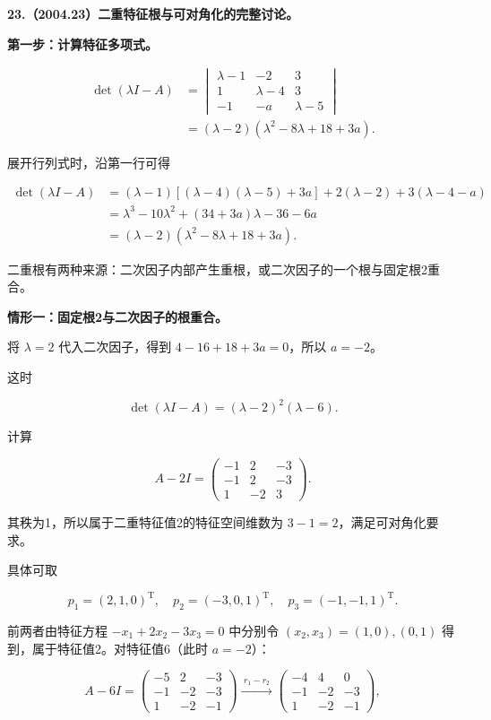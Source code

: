 \documentclass[UTF8,11pt,fontset=windows]{ctexart}
\begin{document}
\clearpage

\textbf{23.（2004.23）二重特征根与可对角化的完整讨论。}

\textbf{第一步：计算特征多项式。}

$$
\begin{aligned}
\det(\lambda I-A)
&=\begin{vmatrix}\lambda-1&-2&3\\1&\lambda-4&3\\-1&-a&\lambda-5\end{vmatrix}\\
&=(\lambda-2)(\lambda^2-8\lambda+18+3a).
\end{aligned}
$$

展开行列式时，沿第一行可得

$$
\begin{aligned}
\det(\lambda I-A)
 &=(\lambda-1)[(\lambda-4)(\lambda-5)+3a]
   +2(\lambda-2)+3(\lambda-4-a)\\
 &=\lambda^3-10\lambda^2+(34+3a)\lambda-36-6a\\
 &=(\lambda-2)(\lambda^2-8\lambda+18+3a).
\end{aligned}
$$

二重根有两种来源：二次因子内部产生重根，或二次因子的一个根与固定根2重合。

\textbf{情形一：固定根2与二次因子的根重合。}

将 $\lambda=2$ 代入二次因子，得到 $4-16+18+3a=0$，所以 $a=-2$。

这时

$$
\det(\lambda I-A)=(\lambda-2)^2(\lambda-6).
$$

计算

$$
A-2I=\begin{pmatrix}-1&2&-3\\-1&2&-3\\1&-2&3\end{pmatrix}.
$$

其秩为1，所以属于二重特征值2的特征空间维数为 $3-1=2$，满足可对角化要求。

具体可取

$$
p_1=(2,1,0)^{\mathrm T},\quad p_2=(-3,0,1)^{\mathrm T},\quad
p_3=(-1,-1,1)^{\mathrm T}.
$$

前两者由特征方程 $-x_1+2x_2-3x_3=0$ 中分别令 $(x_2,x_3)=(1,0),(0,1)$ 得到，属于特征值2。对特征值6（此时 $a=-2$）：

$$
A-6I=\begin{pmatrix}-5&2&-3\\-1&-2&-3\\1&-2&-1\end{pmatrix}
\xrightarrow{\;r_1-r_2\;}
\begin{pmatrix}-4&4&0\\-1&-2&-3\\1&-2&-1\end{pmatrix},
$$
\end{document}
